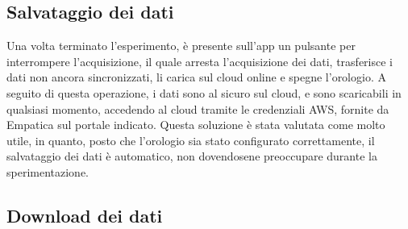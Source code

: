 \subsection{Salvataggio dei dati}

Una volta terminato l'esperimento, è presente sull'app un pulsante per interrompere l'acquisizione, il quale arresta l'acquisizione dei dati, trasferisce i dati non ancora sincronizzati, li carica sul cloud online e spegne l'orologio. A seguito di questa operazione, i dati sono al sicuro sul cloud, e sono scaricabili in qualsiasi momento, accedendo al cloud tramite le credenziali AWS, fornite da Empatica sul portale indicato. Questa soluzione è stata valutata come molto utile, in quanto, posto che l’orologio sia stato configurato correttamente, il salvataggio dei dati è automatico, non dovendosene preoccupare durante la sperimentazione.

\subsection{Download dei dati}
\label{sec:download_empatica_data}

